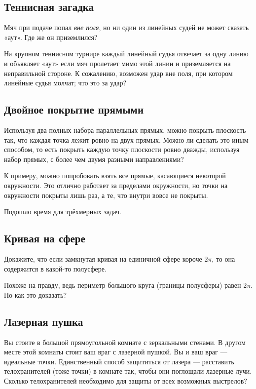 \subsection*{Теннисная загадка}

Мяч при подаче попал \emph{вне поля}, но ни один из линейных судей не может сказать «аут».
Где же он приземлился?

На крупном теннисном турнире каждый линейный судья отвечает за одну линию и объявляет «аут» если мяч пролетает мимо этой линии и приземляется на неправильной стороне.
К сожалению, возможен удар вне поля, при котором линейные судья молчат; что это за удар?

\subsection*{Двойное покрытие прямыми}

Используя два полных набора параллельных прямых, можно покрыть плоскость так, что каждая точка лежит ровно на двух прямых.
Можно ли сделать это иным способом, то есть покрыть каждую точку плоскости ровно дважды, используя набор прямых, с более чем двумя разными направлениями?

 К примеру, можно попробовать взять все прямые, касающиеся некоторой окружности.
Это отлично работает за пределами окружности, но точки на окружности покрыты лишь раз, а те, что внутри вовсе не покрыты.

\medskip

Подошло время для трёхмерных задач.

\subsection*{Кривая на сфере}

Докажите, что если замкнутая кривая на единичной сфере короче $2\pi$, то она содержится в какой-то полусфере.

 Похоже на правду, ведь периметр большого круга (границы полусферы) равен $2\pi$.
Но как это доказать?

\subsection*{Лазерная пушка}

Вы стоите в большой прямоугольной комнате с зеркальными стенами.
В другом месте этой комнаты стоит ваш враг с лазерной пушкой.
Вы и ваш враг --- идеальные точки.
Единственный способ защититься от лазера --- расставить телохранителей (тоже точки) в комнате так, чтобы они поглощали лазерные лучи.
Сколько телохранителей необходимо для защиты от всех возможных выстрелов?

